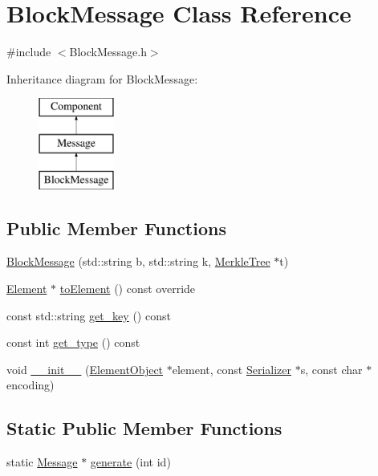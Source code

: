 \hypertarget{classBlockMessage}{}\section{Block\+Message Class Reference}
\label{classBlockMessage}


{\ttfamily \#include $<$Block\+Message.\+h$>$}

Inheritance diagram for Block\+Message\+:\begin{figure}[H]
\begin{center}
\leavevmode
\includegraphics[height=3.000000cm]{classBlockMessage}
\end{center}
\end{figure}
\subsection*{Public Member Functions}
\begin{DoxyCompactItemize}
\item 
\mbox{\hyperlink{classBlockMessage_a0e13dac3bd793b19550db5e72eb30a2c}{Block\+Message}} (std\+::string b, std\+::string k, \mbox{\hyperlink{classMerkleTree}{Merkle\+Tree}} $\ast$t)
\item 
\mbox{\hyperlink{classElement}{Element}} $\ast$ \mbox{\hyperlink{classBlockMessage_ab47afd5cfb7d6d5c544d8def5d0f9737}{to\+Element}} () const override
\item 
const std\+::string \mbox{\hyperlink{classBlockMessage_a62842475d6d9d9b82806c3a90ed56123}{get\+\_\+key}} () const
\item 
const int \mbox{\hyperlink{classMessage_a2a576dcffd45c4574fcdf2897ec26086}{get\+\_\+type}} () const
\item 
void \mbox{\hyperlink{classComponent_a28212595f8ee85fe009bd233bc99b2fc}{\+\_\+\+\_\+init\+\_\+\+\_\+}} (\mbox{\hyperlink{classElementObject}{Element\+Object}} $\ast$element, const \mbox{\hyperlink{classSerializer}{Serializer}} $\ast$s, const char $\ast$encoding)
\end{DoxyCompactItemize}
\subsection*{Static Public Member Functions}
\begin{DoxyCompactItemize}
\item 
static \mbox{\hyperlink{classMessage}{Message}} $\ast$ \mbox{\hyperlink{classMessage_ad92a0e1cfa5b5a503ec9c61833e3e5ea}{generate}} (int id)
\end{DoxyCompactItemize}
